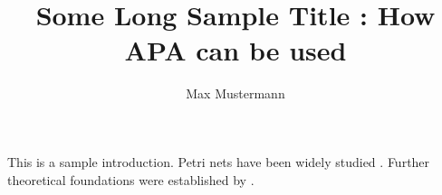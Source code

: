 \documentclass[man]{apa6}
\title{Some Long Sample Title : How APA can be used}
\author{Max Mustermann}
\affiliation{Some university}
\begin{document}
\maketitle

This is a sample introduction. Petri nets have been widely studied \parencite{smith2020example}. 
Further theoretical foundations were established by \textcite{jones2019petri}.

\printbibliography

\appendix

\end{document}
